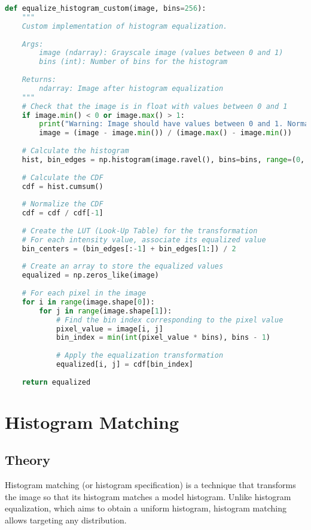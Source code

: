 \documentclass[12pt,a4paper]{article}
\begin{document}
\begin{lstlisting}[language=Python, caption=Histogram equalization implementation]
def equalize_histogram_custom(image, bins=256):
    """
    Custom implementation of histogram equalization.
    
    Args:
        image (ndarray): Grayscale image (values between 0 and 1)
        bins (int): Number of bins for the histogram
        
    Returns:
        ndarray: Image after histogram equalization
    """
    # Check that the image is in float with values between 0 and 1
    if image.min() < 0 or image.max() > 1:
        print("Warning: Image should have values between 0 and 1. Normalization applied.")
        image = (image - image.min()) / (image.max() - image.min())
    
    # Calculate the histogram
    hist, bin_edges = np.histogram(image.ravel(), bins=bins, range=(0, 1))
    
    # Calculate the CDF
    cdf = hist.cumsum()
    
    # Normalize the CDF
    cdf = cdf / cdf[-1]
    
    # Create the LUT (Look-Up Table) for the transformation
    # For each intensity value, associate its equalized value
    bin_centers = (bin_edges[:-1] + bin_edges[1:]) / 2
    
    # Create an array to store the equalized values
    equalized = np.zeros_like(image)
    
    # For each pixel in the image
    for i in range(image.shape[0]):
        for j in range(image.shape[1]):
            # Find the bin index corresponding to the pixel value
            pixel_value = image[i, j]
            bin_index = min(int(pixel_value * bins), bins - 1)
            
            # Apply the equalization transformation
            equalized[i, j] = cdf[bin_index]
    
    return equalized
\end{lstlisting}

\section{Histogram Matching}

\subsection{Theory}

Histogram matching (or histogram specification) is a technique that transforms the image so that its histogram matches a model histogram. Unlike histogram equalization, which aims to obtain a uniform histogram, histogram matching allows targeting any distribution.
\end{document}
